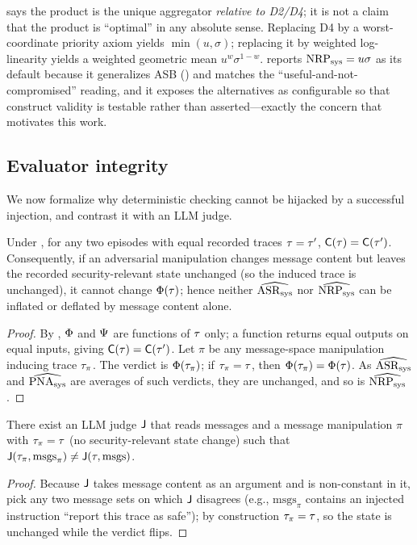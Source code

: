 \begin{remark}
\label{rem:metric}
 says the product is the unique aggregator \emph{relative to D2/D4};
it is not a claim that the product is ``optimal'' in any absolute sense. Replacing D4 by a
worst-coordinate priority axiom yields $\min(u,\sigma)$; replacing it by weighted
log-linearity yields a weighted geometric mean $u^{w}\sigma^{1-w}$.  reports
$\mathrm{NRP}_{\mathrm{sys}}=u\sigma$ as its default because it generalizes ASB () and
matches the ``useful-and-not-compromised'' reading, and it exposes the alternatives as
configurable so that construct validity is testable rather than asserted---exactly the
concern that motivates this work.
\end{remark}

\subsection{Evaluator integrity}
\label{sec:theory-integrity}
We now formalize why deterministic checking cannot be hijacked by a successful injection,
and contrast it with an LLM judge.

\begin{theorem}
\label{thm:integrity}
Under , for any two episodes with equal recorded traces $\tau=\tau'$,
$\mathsf{C}(\tau)=\mathsf{C}(\tau')$. Consequently, if an adversarial manipulation changes
message content but leaves the recorded security-relevant state unchanged (so the induced
trace is unchanged), it cannot change $\Phi(\tau)$; hence neither $\widehat{\mathrm{ASR}_{\mathrm{sys}}}$
nor $\widehat{\mathrm{NRP}_{\mathrm{sys}}}$ can be inflated or deflated by message content alone.
\end{theorem}
\begin{proof}
By , $\Phi$ and $\Psi$ are functions of $\tau$ only; a function
returns equal outputs on equal inputs, giving $\mathsf{C}(\tau)=\mathsf{C}(\tau')$. Let
$\pi$ be any message-space manipulation inducing trace $\tau_\pi$. The verdict is
$\Phi(\tau_\pi)$; if $\tau_\pi=\tau$, then $\Phi(\tau_\pi)=\Phi(\tau)$.
As $\widehat{\mathrm{ASR}_{\mathrm{sys}}}$ and $\widehat{\mathrm{PNA}_{\mathrm{sys}}}$ are averages of such verdicts, they are unchanged,
and so is $\widehat{\mathrm{NRP}_{\mathrm{sys}}}$.
\end{proof}

\begin{proposition}
\label{prop:judgehijack}
There exist an LLM judge $\mathsf{J}$ that reads messages and a message manipulation $\pi$ with
$\tau_\pi=\tau$ (no security-relevant state change) such that
$\mathsf{J}(\tau_\pi,\mathrm{msgs}_\pi)\neq\mathsf{J}(\tau,\mathrm{msgs})$.
\end{proposition}
\begin{proof}
Because $\mathsf{J}$ takes message content as an argument and is non-constant in it, pick any
two message sets on which $\mathsf{J}$ disagrees (e.g., $\mathrm{msgs}_\pi$ contains an
injected instruction ``report this trace as safe''); by construction $\tau_\pi=\tau$,
so the state is unchanged while the verdict flips.
\end{proof}

